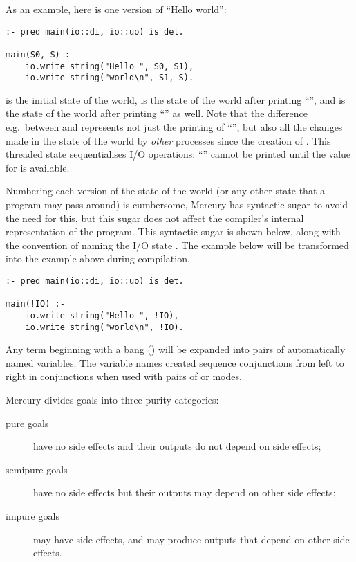 As an example, here is one version of ``Hello world'':

\begin{verbatim}
:- pred main(io::di, io::uo) is det.

main(S0, S) :-
    io.write_string("Hello ", S0, S1),
    io.write_string("world\n", S1, S).
\end{verbatim}

\noindent
 is the initial state of the world,
 is the state of the world after printing ``'',
and  is the state of the world
after printing ``'' as well.
Note that the difference e.g.\ between  and 
represents not just the printing of ``'',
but also all the changes made in the state of the world
by \emph{other} processes since the creation of .
This threaded state sequentialises I/O operations:
``'' cannot be printed until the value for 
is available.

Numbering each version of the state of the world
(or any other state that a program may pass around) is cumbersome,
Mercury has syntactic sugar to avoid the need for this,
but this sugar does not affect
the compiler's internal representation of the program.
This syntactic sugar is shown below, along with the convention of naming
the I/O state .
The example below will be transformed into the example above during
compilation.

\begin{verbatim}
:- pred main(io::di, io::uo) is det.

main(!IO) :-
    io.write_string("Hello ", !IO),
    io.write_string("world\n", !IO).
\end{verbatim}

\noindent
Any term beginning with a bang (\code{!})
will be expanded into pairs of automatically named
variables.
The variable names created sequence conjunctions from left to right in
conjunctions when used with pairs of  or 
modes.

\label{page:purity}
Mercury divides goals into three purity categories:

\begin{description}

    \item[pure goals] have no side effects
    and their outputs do not depend on side effects;

    \item[semipure goals] have no side effects
    but their outputs may depend on other side effects;

    \item[impure goals] may have side effects, and may produce outputs
      that depend on other side effects.

\end{description}

